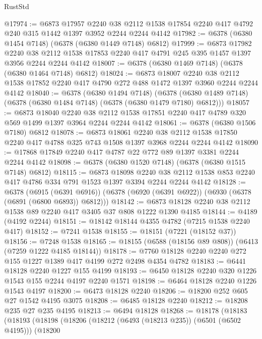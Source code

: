 \begin{lexlean}{RustStd}
\begin{coremodule}
@17974 := @6873
    @17957
    @2240
    @38
    @2112
    @1538
    @17854
    @2240
    @417
    @4792
    @240
    @315
    @1442
    @1397
    @3952
    @2244
    @2244
    @4142
@17982 := @6378 (@6380 @1454 @7148) (@6378 (@6380 @1449 @7148) @6812)
@17999 := @6873
    @17982
    @2240
    @38
    @2112
    @1538
    @17853
    @2240
    @417
    @4791
    @245
    @395
    @1457
    @1397
    @3956
    @2244
    @2244
    @4142
@18007 := @6378 (@6380 @1469 @7148) (@6378 (@6380 @1464 @7148) @6812)
@18024 := @6873
    @18007
    @2240
    @38
    @2112
    @1538
    @17852
    @2240
    @417
    @4790
    @272
    @488
    @1472
    @1397
    @3960
    @2244
    @2244
    @4142
@18040 := @6378
    (@6380 @1494 @7148)
    (@6378 (@6380 @1489 @7148) (@6378 (@6380 @1484 @7148) (@6378 (@6380 @1479 @7180) @6812)))
@18057 := @6873
    @18040
    @2240
    @38
    @2112
    @1538
    @17851
    @2240
    @417
    @4789
    @320
    @569
    @1499
    @1397
    @3964
    @2244
    @2244
    @4142
@18061 := @6378 (@6380 @1506 @7180) @6812
@18078 := @6873
    @18061
    @2240
    @38
    @2112
    @1538
    @17850
    @2240
    @417
    @4788
    @325
    @743
    @1508
    @1397
    @3968
    @2244
    @2244
    @4142
@18090 := @17868 @17849 @2240 @417 @4787 @22 @772 @89 @1397 @3381 @2244 @2244 @4142
@18098 := @6378 (@6380 @1520 @7148) (@6378 (@6380 @1515 @7148) @6812)
@18115 := @6873
    @18098
    @2240
    @38
    @2112
    @1538
    @853
    @2240
    @417
    @4786
    @334
    @791
    @1523
    @1397
    @3394
    @2244
    @2244
    @4142
@18128 := @6378
    (@6915 (@6391 @6916))
    (@6378 (@6920 (@6391 @6922)) (@6930 (@6378 (@6891 (@6800 @6893)) @6812)))
@18142 := @6873 @18128 @2240 @38 @2112 @1538 @89 @2240 @417 @3405 @37 @808 @1222 @1390 @4185
@18144 := @4189 (@4192 @2244)
@18151 := @18142 @18144 @4355 @4782 (@7215 @1538 @2240 @417)
@18152 := @7241 @1538
@18155 := @18151 (@7221 (@18152 @37))
@18156 := @7248 @1538
@18165 := @18155 (@6588 (@18156 @89 @808)) (@6413 (@7259 @1222 @4185 @18144))
@18178 := @7760 @18128 @2240 @2240 @272 @155 @1227 @1389 @417 @4199 @272 @2498 @4354 @4782
@18183 := @6441 @18128 @2240 @1227 @155 @4199
@18193 := @6450 @18128 @2240 @320 @1226 @1543 @155 @2244 @4197 @2240 @1571
@18198 := @6464 @18128 @2240 @1226 @1543 @4197
@18200 := @6473 @18128 @2240
@18206 := @18200 @252 @605 @27 @1542 @4195 @3075
@18208 := @6485 @18128 @2240
@18212 := @18208 @235 @27 @235 @4195
@18213 := @6494 @18128
@18268 := @18178
    (@18183
      (@18193
        (@18198
          (@18206
            (@18212 (@6493 (@18213 @235)) (@6501 (@6502 @4195)))
            (@18200

\end{coremodule}
\end{lexlean}
